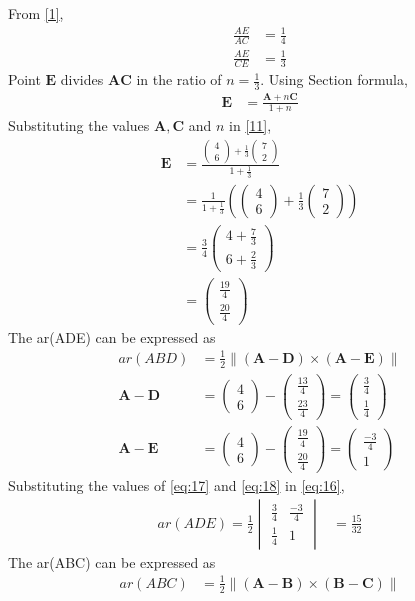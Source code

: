 \documentclass[12pt]{article}
\newcommand{\mydet}[1]{\ensuremath{\begin{vmatrix}#1\end{vmatrix}}}
\providecommand{\brak}[1]{\ensuremath{\left(#1\right)}}
\providecommand{\norm}[1]{\left\lVert#1\right\rVert}
\newcommand{\myvec}[1]{\ensuremath{\begin{pmatrix}#1\end{pmatrix}}}
\let\vec\mathbf
\begin{document}
\begin{enumerate}
From \eqref{1},
\begin{align}
\frac{AE}{AC} &=\frac{1}{4}\\
\frac{AE}{CE} &=\frac{1}{3}
\end{align}
Point $\vec{E}$ divides $\vec{A}\vec{C}$ in the ratio of $n = \frac{1}{3}$.
Using Section formula,
\begin{align}
\vec{E} &=\frac{\vec{A}+n\vec{C}}{1+n}\label{11}
\end{align}
Substituting the values $\vec{A},\vec{C}$ and $n$ in \eqref{11},
\begin{align}
\vec{E} &=\frac{{\myvec{4\\6}+\frac{1}{3}\myvec{7\\2}}}{1+\frac{1}{3}}\\
	&=\frac{1}{1+\frac{1}{3}}\brak{{\myvec{4\\6}+\frac{1}{3}\myvec{7\\2}}} \\
	&=\frac{3}{4}\myvec{4+\frac{7}{3}\\[2pt]6+\frac{2}{3}}\\
	&=\myvec{\frac{19}{4}\\[2pt] \frac{20}{4}}
\end{align}
The ar(ADE) can be expressed as
\begin{align}
	ar(ABD) &=\frac{1}{2} \norm{\brak{\vec{A}-\vec{D}}  \times 
   \brak{\vec{A}- \vec{E}}} \label{eq:16} \\
	\vec{A}- \vec{D} &= \myvec{4\\6}-\myvec{\frac{13}{4}\\[2pt] \frac{23}{4}}=\myvec{\frac{3}{4}\\[2pt] \frac{1}{4}}\label{eq:17}\\
	  \vec{A}- \vec{E} &= \myvec{4\\6}-\myvec{\frac{19}{4}\\[2pt] \frac{20}{4}}=\myvec{\frac{-3}{4}\\[2pt]1}\label{eq:18}
  \end{align}
Substituting the values of \eqref{eq:17} and \eqref{eq:18} in \eqref{eq:16},
\begin{align}
	ar(ADE)=\frac{1}{2}\mydet{\frac{3}{4} & \frac{-3}{4}\\[2pt] \frac{1}{4} & 1}  
	&=	\frac{15}{32}
\end{align}
The ar(ABC) can be expressed as
  \begin{align}
	  ar(ABC) &=\frac{1}{2} \norm{\brak{\vec{A}-\vec{B}}  \times 
   \brak{\vec{B}- \vec{C}}} \label{eq:20} \\

\end{align}
\end{enumerate}
\end{document}
